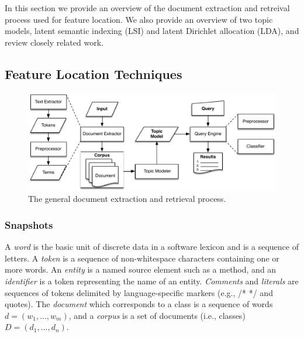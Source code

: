 
In this section we provide an overview of the document extraction and retreival process
used for feature location.
We also provide an overview of two topic models,
latent semantic indexing (LSI) and latent Dirichlet allocation (LDA),
and review closely related work.

\subsection{Feature Location Techniques} %


\begin{figure}
\vspace{2mm}
\centerline{\includegraphics[width=.8625\textwidth]{figures/Process}}
\caption{The general document extraction and retrieval process.}
\label{fig:process}
\vspace{-2mm}
\end{figure}


\subsubsection{Snapshots}

A \textit{word} is the basic unit of discrete data in a software lexicon and is a sequence of letters.
A \textit{token} is a sequence of non-whitespace characters containing one or more words.
An \textit{entity} is a named source element such as a method,
and an \textit{identifier} is a token representing the name of an entity.
\textit{Comments} and \textit{literals} are sequences of tokens delimited by language-specific markers (e.g., /* */ and quotes).
The \textit{document} which corresponds to a class is a sequence of words $d = (w_1, \ldots, w_m)$,
and a \textit{corpus} is a set of documents (i.e., classes) $D = (d_1, \ldots, d_n)$.

